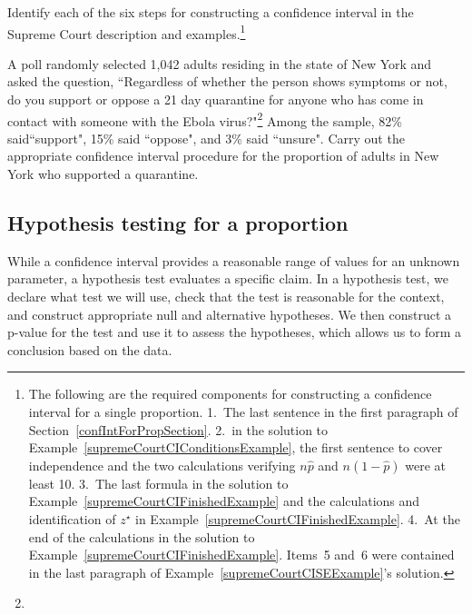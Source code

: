 \begin{exercise}
Identify each of the six steps for constructing a confidence interval in the Supreme Court description and examples.\footnote{The following are the required components for constructing a confidence interval for a single proportion. 1.~The last sentence in the first paragraph of Section~\ref{confIntForPropSection}. 2.~in the solution to Example~\ref{supremeCourtCIConditionsExample}, the first sentence to cover independence and the two calculations verifying $n\hat{p}$ and $n(1-\hat{p})$ were at least 10. 3.~The last formula in the solution to Example~\ref{supremeCourtCIFinishedExample} and the calculations and identification of $z^{\star}$ in Example~\ref{supremeCourtCIFinishedExample}. 4.~At the end of the calculations in the solution to Example~\ref{supremeCourtCIFinishedExample}. Items~5 and~6 were contained in the last paragraph of Example~\ref{supremeCourtCISEExample}'s solution.}
\end{exercise}

\begin{example}{A poll randomly selected 1,042 adults residing in the state of New York and asked the question, ``Regardless of whether the person shows symptoms or not, do you support or oppose a 21 day quarantine for anyone who has come in contact with someone with the Ebola virus?"\footnote{} Among the sample, 82\% said``support", 15\% said ``oppose", and 3\% said ``unsure". Carry out the appropriate confidence interval procedure for the proportion of adults in New York who supported a quarantine.}
\end{example}

\subsection{Hypothesis testing for a proportion}
\label{htForPropSection}

While a confidence interval provides a reasonable range of values for an unknown parameter, a hypothesis test evaluates a specific claim. In a hypothesis test, we declare what test we will use, check that the test is reasonable for the context, and construct appropriate null and alternative hypotheses. We then construct a p-value for the test and use it to assess the hypotheses, which allows us to form a conclusion based on the data.

